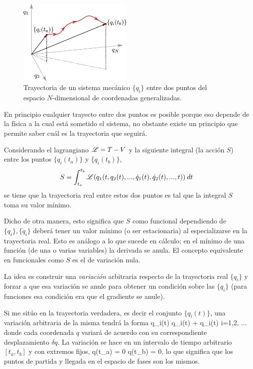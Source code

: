 \documentclass[10pt,oneside]{CBFT_book}
\begin{document}
\begin{figure}[bth]
	\begin{center}
	\includegraphics[width=0.5\textwidth]{images/fig_hamilton.pdf}	 
	\end{center}
	\caption{Trayectoria de un sistema mecánico $\{ q_i \}$ entre dos puntos del espacio $N$-dimensional de
	coordenadas generalizadas.}
	\label{principio_hamilton}
\end{figure}

En principio cualquier trayecto entre dos puntos es posible porque eso depende de la física a la cual está sometido
el sistema, no obstante existe un principio que permite saber cuál es la trayectoria que seguirá.

Considerando el lagrangiano $ \mathscr{L} = T - V $ y la siguiente integral (la acción $S$) entre los puntos $ \{ q_i(t_a) \} $
y $ \{ q_i(t_b) \} $,
\[
	S = \int_{t_a}^{t_b} \mathscr{L}( q_1(t, q_2(t), ..., \dot{q}_1(t),\dot{q}_2(t), ...,t )) \: dt
\]
se tiene que la trayectoria real entre estos dos puntos es tal que la integral $S$ toma su valor mínimo.

Dicho de otra manera, esto significa que $ S $ como funcional dependiendo de $ \{ q_i \}, \{ \dot{q}_i \} $
deberá tener un valor mínimo (o ser estacionaria) al especializarse en la trayectoria real.
Esto es análogo a lo que sucede en cálculo; en el mínimo de una función (de una o varias variables) la derivada 
se anula. El concepto equivalente en funcionales como $ S $ es el de variación nula.

La idea es construir una {\it variación} arbitraria respecto de la trayectoria real $ \{ q_i \} $ y forzar a que esa 
variación se anule para obtener un condición sobre las $ \{ q_i \} $ (para funciones esa condición era que el gradiente
se anule).

Si me sitúo en la trayectoria verdadera, es decir el conjunto $ \{ q_i(t) \}$, una variación arbitraria de la misma
tendrá la forma
\be
	q_i(t) \rightarrow q_i(t) + \delta q_i(t) \qquad i=1,2, ...
	\label{variacion}
\ee
donde cada coordenada $ q $ variará de acuerdo con su correspondiente desplazamiento $\delta q $.
La variación se hace en un intervalo de tiempo arbitrario $ [t_a,t_b] $ y con extremos fijos, 
\be
	\delta q(t_a) = 0 \qquad \qquad \delta q(t_b) = 0,
	\label{extremos_fijos}
\ee
lo que significa que los puntos de partida y llegada en el espacio de fases son los mismos.
\end{document}
